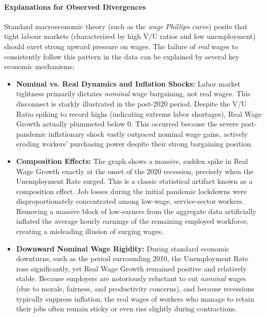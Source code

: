 \documentclass[dvipsnames,11pt]{article}
\begin{document}
\begin{enumerate}
\begin{solution}
                    \paragraph*{Explanations for Observed Divergences}
                    Standard macroeconomic theory (such as the \textit{wage Phillips curve}) posits that tight labour markets (characterized by high V/U ratios and low unemployment) should exert strong upward pressure on wages. The failure of \textit{real} wages to consistently follow this pattern in the data can be explained by several key economic mechanisms:
                    \begin{itemize}
                        \item \textbf{Nominal vs. Real Dynamics and Inflation Shocks:} Labor market tightness primarily dictates \textit{nominal} wage bargaining, not real wages. This disconnect is starkly illustrated in the post-2020 period. Despite the V/U Ratio spiking to record highs (indicating extreme labor shortages), Real Wage Growth actually plummeted below $0$. This occurred because the severe post-pandemic inflationary shock vastly outpaced nominal wage gains, actively eroding workers' purchasing power despite their strong bargaining position.
                        
                        \item \textbf{Composition Effects:} The graph shows a massive, sudden spike in Real Wage Growth exactly at the onset of the 2020 recession, precisely when the Unemployment Rate surged. This is a classic statistical artifact known as a composition effect. Job losses during the initial pandemic lockdowns were disproportionately concentrated among low-wage, service-sector workers. Removing a massive block of low-earners from the aggregate data artificially inflated the average hourly earnings of the remaining employed workforce, creating a misleading illusion of surging wages.
                        
                        \item \textbf{Downward Nominal Wage Rigidity:} During standard economic downturns, such as the period surrounding 2010, the Unemployment Rate rose significantly, yet Real Wage Growth remained positive and relatively stable. Because employers are notoriously reluctant to cut \textit{nominal} wages (due to morale, fairness, and productivity concerns), and because recessions typically suppress inflation, the real wages of workers who manage to retain their jobs often remain sticky or even rise slightly during contractions.
                    \end{itemize}
                    
                \end{solution}
                
        \end{enumerate}
\end{document}
